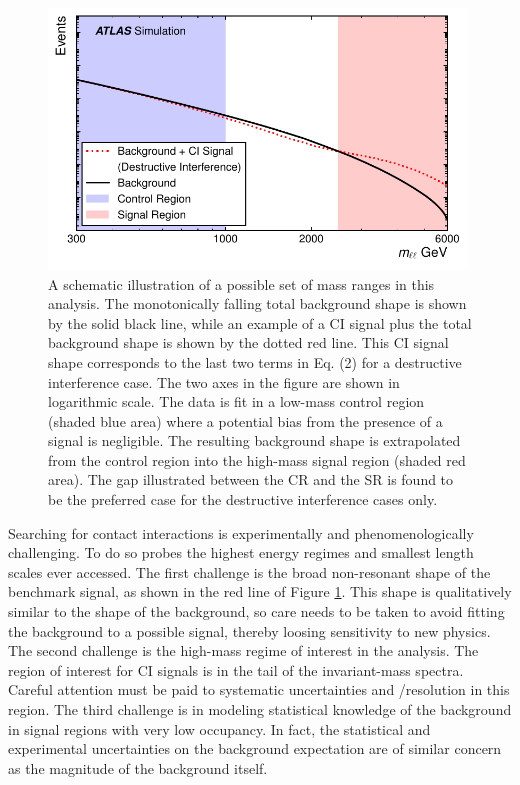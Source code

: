 \begin{figure}[h!]
\captionsetup[subfigure]{position=b}
\centering
\includegraphics[width=0.99\textwidth]{figures/ci/massRanges.pdf}
\caption{A schematic illustration of a possible set of mass ranges in this analysis. The monotonically falling total background shape is shown by the solid black line, while an example of a CI signal plus the total background shape is shown by the dotted red line. This CI signal shape corresponds to the last two terms in Eq. (2) for a destructive interference case. The two axes in the figure are shown in logarithmic scale. The data is fit in a low-mass control region (shaded blue area) where a potential bias from the presence of a signal is negligible. The resulting background shape is extrapolated from the control region into the high-mass signal region (shaded red area). The gap illustrated between the CR and the SR is found to be the preferred case for the destructive interference cases only.}
\label{fig:ciStrat}
\end{figure}

Searching for contact interactions is experimentally and phenomenologically challenging.
To do so probes the highest energy regimes and smallest length scales ever accessed.
The first challenge is the broad non-resonant shape of the benchmark signal, as shown in the red line of Figure \ref{fig:ciStrat}.
This shape is qualitatively similar to the shape of the background, so care needs to be taken to avoid fitting the background to a possible signal, thereby loosing sensitivity to new physics.
The second challenge is the high-mass regime of interest in the analysis. The region of interest for CI signals is in the tail of the invariant-mass spectra.
Careful attention must be paid to systematic uncertainties and \pt/\et resolution in this region.
The third challenge is in modeling statistical knowledge of the background in signal regions with very low occupancy.
In fact, the statistical and experimental uncertainties on the background expectation are of similar concern as the magnitude of the background itself.

